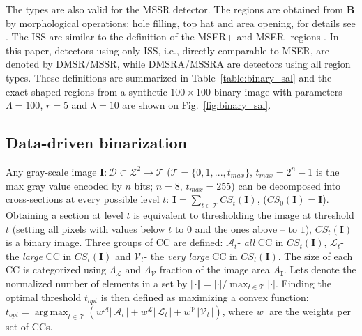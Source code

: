 \documentclass{article}
\def\B{{\mathbf B}}
\def\I{{\mathbf I}}
\def\mcT{{\mathcal{T}}}
\def\mcD{{\mathcal{D}}}
\def\mcA{{\mathcal{A}}}
\def\mcL{{\mathcal{L}}}
\def\mcV{{\mathcal{V}}}
\DeclareMathOperator*{\argmax}{arg\,max}
\begin{document}
The types are also valid for the MSSR detector. The regions are obtained from $\B$ by morphological operations: hole filling, top hat and area opening, for details see \cite{RangMSSR06, RangHumpb06}. The ISS are similar to the definition of the MSER+ and MSER- regions \cite{Matas2002BMVC}. In this paper, detectors using only ISS, i.e., directly comparable to MSER, are denoted by DMSR/MSSR, while DMSRA/MSSRA are detectors using all region types. These definitions are summarized in Table~\ref{table:binary_sal} and the exact shaped regions from a synthetic $100 \times 100$ binary image with parameters $\Lambda=100$, $r=5$ and $\lambda = 10$ are shown on Fig.~\ref{fig:binary_sal}.

\subsection{Data-driven binarization}
\label{ssec:binarize}
Any gray-scale image  $\I: \mcD \subset \mathcal{Z}^2 \rightarrow \mcT $ ($\mcT = \{0,1, ..., t_{max}\}$, $t_{max} = 2^n-1$ is the max gray value encoded by $n$ bits; $n=8$, $t_{max}=255$) can be decomposed into cross-sections at
every possible level $t$:  $\I = \sum_{t \in \mcT}CS_t(\I)$, 
($CS_0(\I) = \I$). Obtaining a section at level $t$ is equivalent to thresholding the image at threshold $t$ (setting all pixels with values below $t$ to $0$ and the ones above -- to $1$), $CS_t(\I)$ is a binary image. 
Three groups of CC are defined: $\mcA_t$- {\em all} CC in $CS_t(\I)$, $\mcL_t$- the {\em large} CC in $CS_t(\I)$ and 
$\mcV_t$- the {\em very large} CC in $CS_t(\I)$.  The size of each CC is categorized using $\Lambda_{\mcL}$ and $\Lambda_{\mcV}$ fraction of the image area $A_{\I}$. Lets denote the normalized number of elements in a set by $\Vert \cdot \Vert = |\cdot| / \max_{t \in \mcT}|\cdot|$.
Finding the optimal threshold $t_{opt}$ is then defined as maximizing a convex function:
$t_{opt} = \argmax_{t \in \mcT}( w^{\mcA} \Vert \mcA_t \Vert + w^{\mcL} \Vert \mcL_t \Vert + w^{\mcV} \Vert \mcV_t \Vert )$,
where $w^{\cdot}$ are the weights per set of CCs.  
\end{document}
